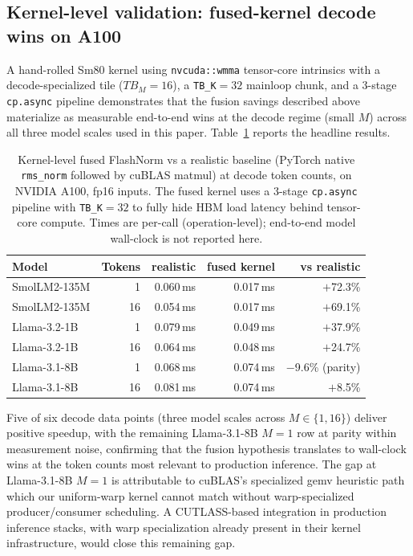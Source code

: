 \documentclass{article}
\begin{document}
\subsection{Kernel-level validation: fused-kernel decode wins on A100}\label{app:a100-decode}

A hand-rolled Sm80 kernel using \texttt{nvcuda::wmma} tensor-core intrinsics with a decode-specialized tile ($TB_M{=}16$), a \texttt{TB\_K}$=32$ mainloop chunk, and a 3-stage \texttt{cp.async} pipeline demonstrates that the fusion savings described above materialize as measurable end-to-end wins at the decode regime (small $M$) across all three model scales used in this paper. Table~\ref{tab:a100-decode-wins} reports the headline results.

\begin{table}[h!] \centering
\caption{Kernel-level fused FlashNorm vs a realistic baseline (PyTorch native \texttt{rms\_norm} followed by cuBLAS matmul) at decode token counts, on NVIDIA A100, fp16 inputs. The fused kernel uses a 3-stage \texttt{cp.async} pipeline with \texttt{TB\_K}$=32$ to fully hide HBM load latency behind tensor-core compute. Times are per-call (operation-level); end-to-end model wall-clock is not reported here.}
\label{tab:a100-decode-wins}
\begin{tabular}{l r r r r}
\hline
Model & Tokens & realistic & fused kernel & vs realistic \\
\hline
SmolLM2-135M & 1   & 0.060\,ms & 0.017\,ms & $+$72.3\% \\
SmolLM2-135M & 16  & 0.054\,ms & 0.017\,ms & $+$69.1\% \\
Llama-3.2-1B & 1   & 0.079\,ms & 0.049\,ms & $+$37.9\% \\
Llama-3.2-1B & 16  & 0.064\,ms & 0.048\,ms & $+$24.7\% \\
Llama-3.1-8B & 1   & 0.068\,ms & 0.074\,ms & $-$9.6\% (parity) \\
Llama-3.1-8B & 16  & 0.081\,ms & 0.074\,ms & $+$8.5\% \\
\hline
\end{tabular}
\end{table}

Five of six decode data points (three model scales across $M \in \{1, 16\}$) deliver positive speedup, with the remaining Llama-3.1-8B $M{=}1$ row at parity within measurement noise, confirming that the fusion hypothesis translates to wall-clock wins at the token counts most relevant to production inference. The gap at Llama-3.1-8B $M{=}1$ is attributable to cuBLAS's specialized gemv heuristic path which our uniform-warp kernel cannot match without warp-specialized producer/consumer scheduling. A CUTLASS-based integration in production inference stacks, with warp specialization already present in their kernel infrastructure, would close this remaining gap.
\end{document}
